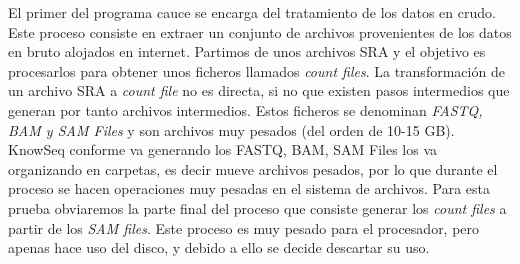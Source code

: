 El primer del programa cauce se encarga del tratamiento de los datos en crudo. Este proceso consiste en extraer un conjunto de archivos provenientes de los datos en bruto alojados en internet. Partimos de unos archivos SRA y el objetivo es procesarlos para obtener unos ficheros llamados \textit{count files}. La transformación de un archivo SRA a \textit{count file} no es directa, si no que existen pasos intermedios que generan por tanto archivos intermedios. Estos ficheros se denominan \textit{FASTQ, BAM y SAM Files} y son archivos muy pesados (del orden de 10-15 GB). KnowSeq conforme va generando los FASTQ, BAM, SAM Files los va organizando en carpetas, es decir mueve archivos pesados, por lo que durante el proceso se hacen operaciones muy pesadas en el sistema de archivos. Para esta prueba obviaremos la parte final del proceso que consiste generar los \textit{count files} a partir de los \textit{SAM files}. Este proceso es muy pesado para el procesador, pero apenas hace uso del disco, y debido a ello se decide descartar su uso.\\

